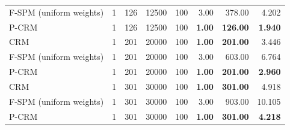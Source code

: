 \begin{tabular}{lrrrrrrr}
F-SPM (uniform weights) & 1 & 126 & 12500 & 100 & 3.00 & 378.00 & 4.202 \\
P-CRM & 1 & 126 & 12500 & 100 & \textbf{1.00} & \textbf{126.00} & \textbf{1.940} \\
\midrule
CRM & 1 & 201 & 20000 & 100 & \textbf{1.00} & \textbf{201.00} & 3.446 \\
F-SPM (uniform weights) & 1 & 201 & 20000 & 100 & 3.00 & 603.00 & 6.764 \\
P-CRM & 1 & 201 & 20000 & 100 & \textbf{1.00} & \textbf{201.00} & \textbf{2.960} \\
\midrule
CRM & 1 & 301 & 30000 & 100 & \textbf{1.00} & \textbf{301.00} & 4.918 \\
F-SPM (uniform weights) & 1 & 301 & 30000 & 100 & 3.00 & 903.00 & 10.105 \\
P-CRM & 1 & 301 & 30000 & 100 & \textbf{1.00} & \textbf{301.00} & \textbf{4.218} \\
\bottomrule
\end{tabular}
